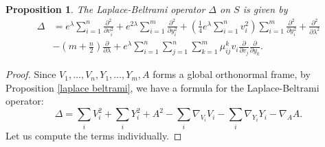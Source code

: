 \documentclass{amsart}
\theoremstyle{plain}
\newtheorem{proposition}[theorem]{Proposition}
\theoremstyle{definition}
\theoremstyle{remark}
\begin{document}
	\begin{proposition}
		\label{laplace coordinates}
		The Laplace-Beltrami operator $\Delta$ on $S$ is given by 
		\begin{align*}
			\Delta &= e^\lambda \sum_{i=1}^n \frac{\partial^2}{\partial v_i^2} + e^{2 \lambda} \sum_{i=1}^m \frac{\partial^2}{\partial y_i^2} + \left( \frac14 e^\lambda \sum_{i=1}^n v_i^2\right) \sum_{i=1}^m \frac{\partial^2}{\partial y_i^2} + \frac{\partial^2}{\partial \lambda^2} \\
			&- \left( m+ \frac n2\right) \frac{\partial}{\partial \lambda} + e^\lambda \sum_{i=1}^n \sum_{j=1}^n \sum_{k=1}^m \mu_{ij}^k v_i \frac{\partial}{\partial v_j} \frac{\partial}{\partial y_k}.
		\end{align*}
	\end{proposition}
	\begin{proof}
		Since $V_1,\ldots,V_n, Y_1,\ldots, Y_m,A$ forms a global orthonormal frame, by Proposition \ref{laplace beltrami}, we have a formula for the Laplace-Beltrami operator:
		\begin{equation}
			\label{m}
			\Delta = \sum_i V_i^2 + \sum_i Y_i^2  + A^2  - \sum_i \nabla_{V_i}V_i- \sum_i \nabla_{Y_i}Y_i - \nabla_A A.
		\end{equation}
		Let us compute the terms individually. 
		

\end{proof}
\end{document}
